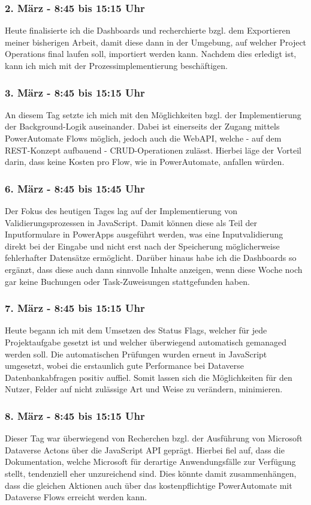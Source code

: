 \subsubsection*{2. März - 8:45 bis 15:15 Uhr}
Heute finalisierte ich die Dashboards und recherchierte bzgl. dem Exportieren meiner bisherigen Arbeit, damit diese dann in der Umgebung, auf welcher Project Operations final laufen soll, importiert werden kann. Nachdem dies erledigt ist, kann ich mich mit der Prozessimplementierung beschäftigen.

\subsubsection*{3. März - 8:45 bis 15:15 Uhr}
An diesem Tag setzte ich mich mit den Möglichkeiten bzgl. der Implementierung der Background-Logik auseinander. Dabei ist einerseits der Zugang mittels PowerAutomate Flows möglich, jedoch auch die WebAPI, welche - auf dem REST-Konzept aufbauend - CRUD-Operationen zulässt. Hierbei läge der Vorteil darin, dass keine Kosten pro Flow, wie in PowerAutomate, anfallen würden.

\subsubsection*{6. März - 8:45 bis 15:45 Uhr}
Der Fokus des heutigen Tages lag auf der Implementierung von Validierungsprozessen in JavaScript. Damit können diese als Teil der Inputformulare in PowerApps ausgeführt werden, was eine Inputvalidierung direkt bei der Eingabe und nicht erst nach der Speicherung möglicherweise fehlerhafter Datensätze ermöglicht. Darüber hinaus habe ich die Dashboards so ergänzt, dass diese auch dann sinnvolle Inhalte anzeigen, wenn diese Woche noch gar keine Buchungen oder Task-Zuweisungen stattgefunden haben.

\subsubsection*{7. März - 8:45 bis 15:15 Uhr}
Heute begann ich mit dem Umsetzen des Status Flags, welcher für jede Projektaufgabe gesetzt ist und welcher überwiegend automatisch gemanaged werden soll. Die automatischen Prüfungen wurden erneut in JavaScript umgesetzt, wobei die erstaunlich gute Performance bei Dataverse Datenbankabfragen positiv auffiel. Somit lassen sich die Möglichkeiten für den Nutzer, Felder auf nicht zulässige Art und Weise zu verändern, minimieren.

\subsubsection*{8. März - 8:45 bis 15:15 Uhr}
Dieser Tag war überwiegend von Recherchen bzgl. der Ausführung von Microsoft Dataverse Actons über die JavaScript API geprägt. Hierbei fiel auf, dass die Dokumentation, welche Microsoft für derartige Anwendungsfälle zur Verfügung stellt, tendenziell eher unzureichend sind. Dies könnte damit zusammenhängen, dass die gleichen Aktionen auch über das kostenpflichtige PowerAutomate mit Dataverse Flows erreicht werden kann.

